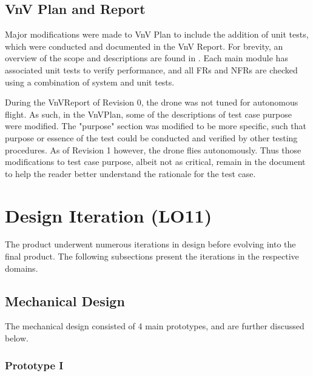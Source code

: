 \documentclass{article}
\begin{document}
\subsection{VnV Plan and Report}

Major modifications were made to VnV Plan to include the addition of unit tests, which were conducted and documented  in the VnV Report. For brevity, an overview of the scope and descriptions are found in . Each main module has associated unit tests to verify performance, and all FRs and NFRs are checked using a combination of system and unit tests.

During the VnVReport of Revision 0, the drone was not tuned for autonomous flight. As such, in the VnVPlan, some of the descriptions of test case purpose were modified. The "purpose" section was modified to be more specific, such that purpose or essence of the test could be conducted and verified by other testing procedures. As of Revision 1 however, the drone flies autonomously. Thus those modifications to test case purpose, albeit not as critical, remain in the document to help the reader better understand the rationale for the test case.   

\section{Design Iteration (LO11)}

The product underwent numerous iterations in design before evolving into the final product. The following subsections present the iterations in the respective domains.

\subsection{Mechanical Design}

The mechanical design consisted of 4 main prototypes, and are further discussed below.

\subsubsection{Prototype I}
\end{document}
